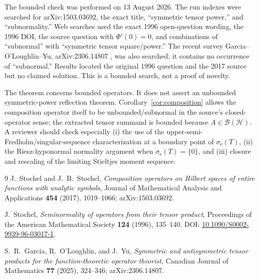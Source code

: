 \documentclass[11pt]{article}
\newcommand{\Hh}{\mathcal H}
\newcommand{\B}{\mathcal B}
\newcommand{\ess}{\mathrm e}
\begin{document}
The bounded check was performed on 13 August 2026.  The run indexes were
searched for arXiv:1503.03692, the exact title, ``symmetric tensor power,''
and ``subnormality.''  Web searches used the exact 1996 open-question wording,
the 1996 DOI, the source question with $\Phi'(0)=0$, and combinations of
``subnormal'' with ``symmetric tensor square/power.''  The recent survey
Garcia--O'Loughlin--Yu, arXiv:2306.14807 \cite{GOY}, was also searched; it
contains no occurrence of ``subnormal.''  Results located the original 1996
question and the 2017 source but no claimed solution.  This is a bounded
search, not a proof of novelty.

The theorem concerns bounded operators.  It does not assert an unbounded
symmetric-power reflection theorem.  Corollary~\ref{cor:composition} allows
the composition operator itself to be unbounded/subnormal in the source's
closed-operator sense; the extracted tensor summand is bounded because
$A\in\B(\Hh)$.  A reviewer should check especially (i) the use of the
upper-semi-Fredholm/singular-sequence characterization at a boundary point of
$\sigma_{\ess}(T)$, (ii) the Riesz-hyponormal normality argument when
$\sigma_{\ess}(T)=\{0\}$, and (iii) closure and rescaling of the limiting
Stieltjes moment sequence.

\begin{thebibliography}{9}
J.~Stochel and J.~B.~Stochel,
\emph{Composition operators on Hilbert spaces of entire functions with
analytic symbols}, Journal of Mathematical Analysis and Applications
\textbf{454} (2017), 1019--1066; arXiv:1503.03692.

J.~Stochel,
\emph{Seminormality of operators from their tensor product},
Proceedings of the American Mathematical Society \textbf{124} (1996),
135--140.  DOI: \href{https://doi.org/10.1090/S0002-9939-96-03017-1}
{10.1090/S0002-9939-96-03017-1}.

S.~R.~Garcia, R.~O'Loughlin, and J.~Yu,
\emph{Symmetric and antisymmetric tensor products for the function-theoretic
operator theorist}, Canadian Journal of Mathematics \textbf{77} (2025),
324--346; arXiv:2306.14807.
\end{thebibliography}
\end{document}
